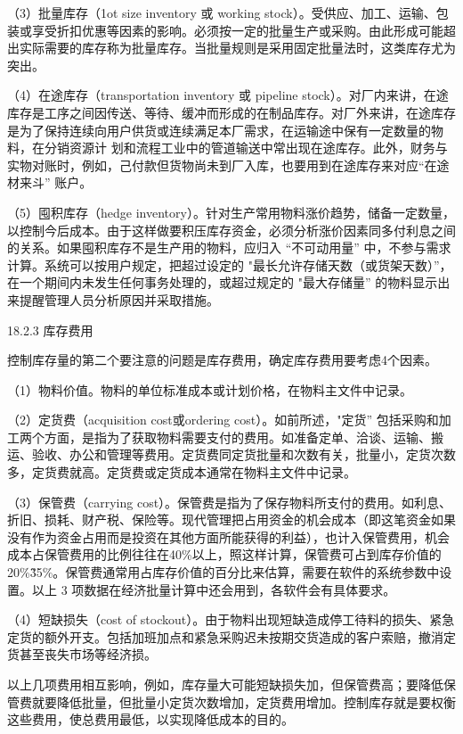     （3）批量库存（1ot size inventory 或 working stock）。受供应、加工、运输、包装或享受折扣优惠等因素的影响。必须按一定的批量生产或采购。由此形成可能超出实际需要的库存称为批量库存。当批量规则是采用固定批量法时，这类库存尤为突出。

    （4）在途库存（transportation inventory 或 pipeline stock）。对厂内来讲，在途库存是工序之间因传送、等待、缓冲而形成的在制品库存。对厂外来讲，在途库存是为了保持连续向用户供货或连续满足本厂需求，在运输途中保有一定数量的物料，在分销资源计
划和流程工业中的管道输送中常出现在途库存。此外，财务与实物对账时，例如，己付款但货物尚未到厂入库，也要用到在途库存来对应“在途材来斗” 账户。

    （5）囤积库存（hedge inventory）。针对生产常用物料涨价趋势，储备一定数量，以控制今后成本。由于这样做要积压库存资金，必须分析涨价因素同多付利息之间的关系。如果囤积库存不是生产用的物料，应归入 “不可动用量” 中，不参与需求计算。系统可以按用户规定，把超过设定的 "最长允许存储天数（或货架天数）”，在一个期间内未发生任何事务处理的，或超过规定的 "最大存储量” 的物料显示出来提醒管理人员分析原因并采取措施。

18.2.3 库存费用

    控制库存量的第二个要注意的问题是库存费用，确定库存费用要考虑4个因素。

    （1）物料价值。物料的单位标准成本或计划价格，在物料主文件中记录。

    （2）定货费（acquisition cost或ordering cost）。如前所述，"定货” 包括采购和加工两个方面，是指为了获取物料需要支付的费用。如准备定单、洽谈、运输、搬运、验收、办公和管理等费用。定货费同定货批量和次数有关，批量小，定货次数多，定货费就高。定货费或定货成本通常在物料主文件中记录。

    （3）保管费（carrying cost）。保管费是指为了保存物料所支付的费用。如利息、折旧、损耗、财产税、保险等。现代管理把占用资金的机会成本（即这笔资金如果没有作为资金占用而是投资在其他方面所能获得的利益），也计入保管费用，机会成本占保管费用的比例往往在40\%以上，照这样计算，保管费可占到库存价值的 20\%\~35\%。保管费通常用占库存价值的百分比来估算，需要在软件的系统参数中设置。以上 3 项数据在经济批量计算中还会用到，各软件会有具体要求。

    （4）短缺损失（cost of stockout）。由于物料出现短缺造成停工待料的损失、紧急定货的额外开支。包括加班加点和紧急采购迟未按期交货造成的客户索赔，撤消定货甚至丧失市场等经济损。

    以上几项费用相互影响，例如，库存量大可能短缺损失加，但保管费高；要降低保管费就要降低批量，但批量小定货次数增加，定货费用增加。控制库存就是要权衡这些费用，使总费用最低，以实现降低成本的目的。

